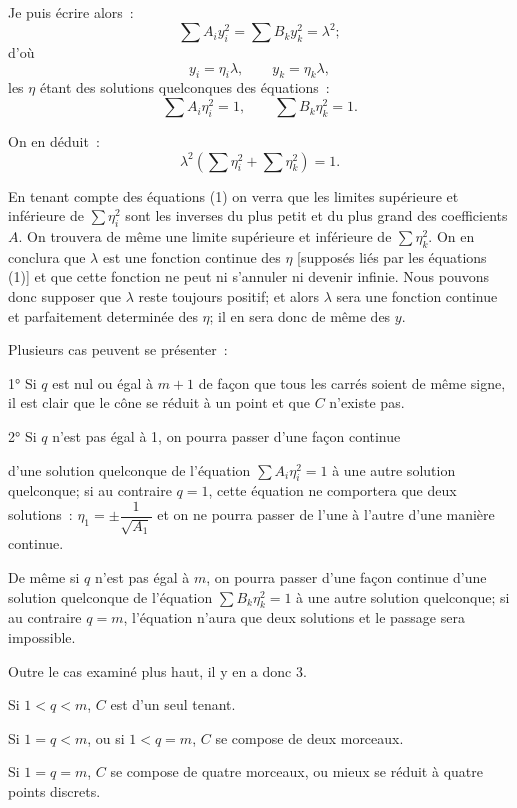 \documentclass{article}
\begin{document}
Je puis écrire alors~:
\[ \sum A_{i} y^{2}_{i} = \sum B_{k} y^{2}_{k} = \lambda^{2}; \]
d'où
\[ y_{i} = \eta_{i} \lambda, \qquad y_{k} = \eta_{k} \lambda, \]
les $\eta$ étant des solutions quelconques des équations~:
\[ \sum A_{i} \eta^{2}_{i} = 1, \qquad \sum B_{k} \eta^{2}_{k} = 1. \tag{1} \]

On en déduit~:
\[ \lambda^{2}\left(\sum \eta^{2}_{i} + \sum \eta^{2}_{k}\right) = 1. \]

En tenant compte des équations (1) on verra que les limites supérieure et inférieure de $\displaystyle\sum \eta^{2}_{i}$ sont les inverses du plus petit et du plus grand des coefficients $A$. On trouvera de même une limite supérieure et inférieure de $\displaystyle\sum \eta^{2}_{k}$. On en conclura que $\lambda$ est une fonction continue des $\eta$ [supposés liés par les équations (1)] et que cette fonction ne peut ni s'annuler ni devenir infinie. Nous pouvons donc supposer que $\lambda$ reste toujours positif; et alors $\lambda$ sera une fonction continue et parfaitement determinée des $\eta$; il en sera donc de même des $y$.

Plusieurs cas peuvent se présenter~:

1° Si $q$ est nul ou égal à $m + 1$ de façon que tous les carrés soient de même signe, il est clair que le cône se réduit à un point et que $C$ n'existe pas.

2° Si $q$ n'est pas égal à 1, on pourra passer d'une façon continue

d'une solution quelconque de l'équation $\displaystyle\sum A_{i} \eta^{2}_{i} = 1$ à une autre solution quelconque; si au contraire $q = 1$, cette équation ne comportera que deux solutions~: $\eta_{1} = \pm \dfrac{1}{\sqrt{A_{1}}}$ et on ne pourra passer de l'une à l'autre d'une manière continue.

De même si $q$ n'est pas égal à $m$, on pourra passer d'une façon continue d'une solution quelconque de l'équation $\displaystyle\sum B_{k} \eta^{2}_{k} = 1$ à une autre solution quelconque; si au contraire $q = m$, l'équation n'aura que deux solutions et le passage sera impossible.

Outre le cas examiné plus haut, il y en a donc 3.

Si $1 < q < m$, $C$ est d'un seul tenant.

Si $1 = q < m$, ou si $1 < q = m$, $C$ se compose de deux morceaux.

Si $1 = q = m$, $C$ se compose de quatre morceaux, ou mieux se réduit à quatre points discrets.
\end{document}
